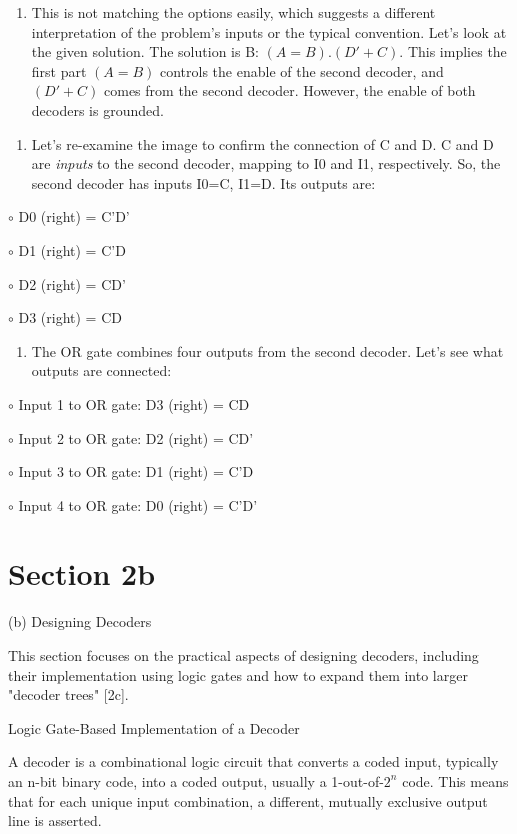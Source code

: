 \documentclass{article}
\begin{document}
\begin{enumerate}
\item This is not matching the options easily, which suggests a different interpretation of the problem's inputs or the typical convention. Let's look at the given solution. The solution is B: $(A=B).(D'+C)$. This implies the first part $(A=B)$ controls the enable of the second decoder, and $(D'+C)$ comes from the second decoder. However, the enable of both decoders is grounded.

\end{enumerate}
\begin{enumerate}
\item Let's re-examine the image to confirm the connection of C and D. C and D are \textit{inputs} to the second decoder, mapping to I0 and I1, respectively. So, the second decoder has inputs I0=C, I1=D. Its outputs are:

\end{enumerate}
    $\circ$ D0 (right) = C'D'

    $\circ$ D1 (right) = C'D

    $\circ$ D2 (right) = CD'

    $\circ$ D3 (right) = CD

\begin{enumerate}
\item The OR gate combines four outputs from the second decoder. Let's see what outputs are connected:

\end{enumerate}
    $\circ$ Input 1 to OR gate: D3 (right) = CD

    $\circ$ Input 2 to OR gate: D2 (right) = CD'

    $\circ$ Input 3 to OR gate: D1 (right) = C'D

    $\circ$ Input 4 to OR gate: D0 (right) = C'D'



\section{Section 2b}

(b) Designing Decoders

This section focuses on the practical aspects of designing decoders, including their implementation using logic gates and how to expand them into larger "decoder trees" [2c].

Logic Gate-Based Implementation of a Decoder

A decoder is a combinational logic circuit that converts a coded input, typically an n-bit binary code, into a coded output, usually a 1-out-of-$2^n$ code. This means that for each unique input combination, a different, mutually exclusive output line is asserted.
\end{document}
